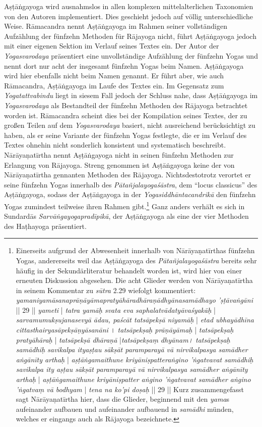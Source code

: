 Aṣṭāṅgayoga wird ausnahmslos in allen komplexen mittelalterlichen Taxonomien von den Autoren implementiert. Dies geschieht jedoch auf völlig unterschiedliche Weise. Rāmacandra nennt Aṣṭāṅgayoga im Rahmen seiner vollständigen Aufzählung der fünfzehn Methoden für Rājayoga nicht, führt Aṣṭāṅgayoga jedoch mit einer eigenen Sektion im Verlauf seines Textes ein. Der Autor der \textit{Yogasvarodaya} präsentiert eine unvollständige Aufzählung der fünfzehn Yogas und nennt dort nur acht der insgesamt fünfzehn Yogas beim Namen. Aṣṭāṅgayoga wird hier ebenfalls nicht beim Namen genannt. Er führt aber, wie auch Rāmacandra, Aṣṭāṅgayoga im Laufe des Textes ein. Im Gegensatz zum \textit{Yogatattvabindu} liegt in siesem Fall jedoch der Schluss nahe, dass Aṣṭāṅgayoga im \textit{Yogasvarodaya} als Bestandteil der fünfzehn Methoden des Rājayoga betrachtet worden ist. Rāmacandra scheint dies bei der Kompilation seines Textes, der zu großen Teilen auf dem \textit{Yogasvarodaya} basiert, nicht ausreichend berücksichtigt zu haben, als er seine Variante der fünfzehn Yogas festlegte, die er im Verlauf des Textes ohnehin nicht sonderlich konsistent und systematisch beschreibt. Nārāyaṇatīrtha nennt Aṣṭāṅgayoga nicht in seinen fünfzehn Methoden zur Erlangung von Rājayoga. Streng genommen ist Aṣṭāṅgayoga keine der von Nārāyaṇatīrtha gennanten Methoden des Rājayoga. Nichtsdestotrotz verortet er seine fünfzehn Yogas innerhalb des \textit{Pātañjalayogaśāstra}, dem ``locus classicus'' des Aṣṭāṅgayoga, sodass der Aṣṭāṅgayoga in der \textit{Yogasiddhāntacandrikā} den fünfzehn Yogas zumindest teilweise ihren Rahmen gibt.\footnote{Einerseits aufgrund der Abwesenheit innerhalb von Nārāyaṇatīrthas fünfzehn Yogas, andererseits weil das Aṣṭāṅgayoga des \textit{Pātañjalayogaśāstra} bereits sehr häufig in der Sekundärliteratur behandelt worden ist, wird hier von einer erneuten Diskussion abgesehen. Die acht Glieder werden von Nārāyaṇatīrtha in seinem Kommentar zu \textit{sūtra} 2.29 wiefolgt kommentiert: \textit{yamaniyamāsanaprāṇāyāmapratyāhāradhāraṇādhyānasamādhayo 'ṣṭāvaṅgāni} || 29 || \textit{yameti} | \textit{tatra yamāḥ svata eva saphalatvādatyāvaśyakāḥ} | \textit{sarvamumukṣujanasevyā ādau, paścāt tatsāpekṣā niyamāḥ} | \textit{etad ubhayādhīna cittasthairyasāpekṣāṇyāsanāni} । \textit{tatsāpekṣaḥ prāṇāyāmaḥ} | \textit{tatsāpekṣaḥ pratyāhāraḥ} | \textit{tatsāpekṣā dhāraṇā} |\textit{tatsāpekṣaṃ dhyānam। tatsāpekṣaḥ samādhiḥ savikalpa ityaṣṭau sākṣāt paramparayā vā nirvikalpasya samādher aṅgānīty arthaḥ} | \textit{aṣṭāṅgamaithune kriyāniṣpatteraṅgino 'ṅgatvavat samādhiḥ savikalpa ity aṣṭau sākṣāt paramparayā vā nirvikalpasya samādher aṅgānīty arthaḥ} | \textit{aṣṭāṅgamaithune kriyāniṣpatter aṅgino 'ṅgatvavat samādher aṅgino 'ṅgatvaṃ vā bodhyam} | \textit{tena na ko'pi doṣaḥ} || 29 || Kurz zusammengefasst sagt Nārāyaṇatīrtha hier, dass die Glieder, beginnend mit den \textit{yama}s aufeinander aufbauen und aufeinander aufbauend in \textit{samādhi} münden, welches er eingangs auch als Rājayoga bezeichnete.} Ganz anders verhält es sich in Sundardās \textit{Sarvāṅgayogapradīpikā}, der Aṣṭāṅgayoga als eine der vier Methoden des Haṭhayoga präsentiert.  

